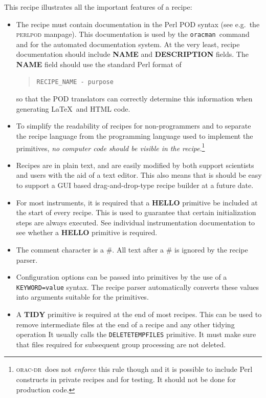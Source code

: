 \documentclass[twoside,11pt]{article}
\renewcommand{\_}{\texttt{\symbol{95}}}
\newcommand{\Oracdr}{\textsc{orac-dr}}
\newcommand{\oracman}{\texttt{oracman}}
\newcommand{\primitive}[1]{{\small\texttt{#1}}}
\newenvironment{myquote}{\begin{quote}\begin{small}}{\end{small}\end{quote}}
\begin{document}
This recipe illustrates all the important features of a recipe:

\begin{itemize}
\item The recipe must contain documentation in the Perl POD syntax
(see e.g.\ the \textsc{perlpod} manpage). This documentation is used
by the \oracman\ command and for the automated documentation system.
At the very least, recipe documentation should include \textbf{NAME}
and \textbf{DESCRIPTION} fields. The \textbf{NAME} field should use
the standard Perl format of
\begin{myquote}
\begin{verbatim}
RECIPE_NAME - purpose
\end{verbatim}
\end{myquote}
so that the POD translators can correctly determine this information
when generating \LaTeX\ and HTML code.

\item To simplify the readability of recipes for non-programmers and
to separate the recipe language from the programming language
used to implement the primitives, \emph{no computer code should be visible
in the recipe}.\footnote{\Oracdr\ does not \emph{enforce} this rule
though and it is possible to include Perl constructs in private
recipes and for testing. It should not be done for production code.}

\item Recipes are in plain text, and are easily modified by both support
scientists and users with the aid of a text editor. This also means
that is should be easy to support a GUI based drag-and-drop-type
recipe builder at a future date.

\item For most instruments, it is required that a \textbf{HELLO}
primitive be included at the start of every recipe. This is used 
to guarantee that certain initialization steps are always
executed. See individual instrumentation documentation to see whether
a \textbf{HELLO} primitive is required.

\item The comment character is a \#. All text after a \# is ignored by 
the recipe parser.

\item Configuration options can be passed into primitives by the use
of a \texttt{KEYWORD=value} syntax. The recipe parser automatically
converts these values into arguments suitable for the primitives.


\item A \textbf{TIDY} primitive is required at the end of most
recipes. This can be used to remove intermediate files at the
end of a recipe and any other tidying operation It usually calls the
\primitive{\_DELETE\_TEMP\_FILES\_} primitive. It must make sure that
files required for subsequent group processing are not deleted.


\end{itemize}
\end{document}
